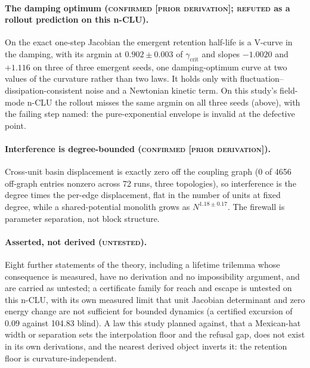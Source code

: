 \documentclass{article} %
\begin{document}
\paragraph{The damping optimum (\textsc{confirmed [prior derivation]}; \textsc{refuted} as a
rollout prediction on this n-CLU).} On the exact one-step Jacobian the emergent retention
half-life is a V-curve in the damping, with its argmin at $0.902\pm0.003$ of
$\gamma_{\text{crit}}$ and slopes $-1.0020$ and $+1.116$ on three of three emergent seeds, one
damping-optimum curve at two values of the curvature rather than two laws.
It holds only with fluctuation--dissipation-consistent noise and a Newtonian kinetic term. On
this study's field-mode n-CLU the rollout misses the same argmin on all three seeds (above), with the
failing step named: the pure-exponential envelope is invalid at the defective point.

\paragraph{Interference is degree-bounded (\textsc{confirmed [prior derivation]}).} Cross-unit
basin displacement is exactly zero off the coupling graph (0 of 4656 off-graph entries nonzero
across 72 runs, three topologies), so interference is the degree times the per-edge displacement,
flat in the number of units at fixed degree, while a shared-potential monolith grows as
$N^{1.18\pm0.17}$. The firewall is parameter separation, not block structure.

\paragraph{Asserted, not derived (\textsc{untested}).} Eight further statements of the theory,
including a lifetime trilemma whose consequence is measured, have no derivation and no
impossibility argument, and are carried as untested; a certificate family for reach and escape is
untested on this n-CLU, with its own measured limit that unit Jacobian determinant and zero
energy change are not sufficient for bounded dynamics (a certified excursion of 0.09 against
104.83 blind). %
A law this study planned against, that a Mexican-hat width or separation sets the
interpolation floor and the refusal gap, does not exist in its own derivations, and the nearest
derived object inverts it: the retention floor is curvature-independent. %
\end{document}
